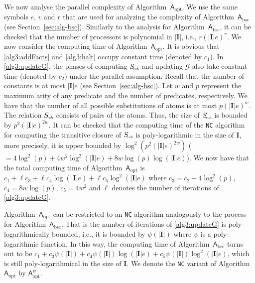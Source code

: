 We now analyse the parallel complexity of Algorithm~$\mathsf{A}_{\text{opt}}$.
We use the same symbols $e$, $v$ and $r$ that are used for analyzing the complexity of Algorithm~$\mathsf{A}_{\text{bsc}}$
(see Section~\ref{sec:alg-bsc}). Similarly to the analysis for Algorithm~$\mathsf{A}_{\text{bsc}}$, it can be checked that
the number of processors is polynomial in $|\textbf{I}|$, i.e., $r(|\textbf{I}|e)^v$.
We now consider the computing time of Algorithm~$\mathsf{A}_{\text{opt}}$. It
is obvious that \ref{alg3:addFacts} and
\ref{alg3:halt} occupy constant time (denoted by $c_1$). In \ref{alg3:updateG}, the phases of
computing $S_{\!\textit{\tiny rch}}$ and updating $\mathcal{G}$ also take constant time (denoted by $c_2$)
under the parallel assumption. Recall that the number of constants is at most $|\textbf{I}|e$ (see Section~\ref{sec:alg-bsc}).
Let $w$ and $p$ represent the maximum arity of any predicate and the number of predicates, respectively.
We have that the number of all possible substitutions of atoms is at most $p(|\textbf{I}|e)^w$.
The relation $S_{\!\textit{\tiny rch}}$ consists of pairs of the atoms. Thus, the size of $S_{\!\textit{\tiny rch}}$
is bounded by $p^2(|\textbf{I}|e)^{2w}$. It can be checked that the computing time of the \texttt{NC} algorithm for computing the transitive
closure of $S_{\!\textit{\tiny rch}}$ is poly-logarithmic in the size of $\textbf{I}$, more precisely,
it is upper bounded by $\log^2(p^2(|\textbf{I}|e)^{2w})$ ($=4\log^2(p)+4w^2\log^2(|\textbf{I}|e)+8w\log(p)\log(|\textbf{I}|e)$).
We now have that the total computing time of
Algorithm~$\mathsf{A}_{\text{opt}}$ is $c_1+\ell c_3 + \ell
c_4\log(|\textbf{I}|e) +\ell c_5\log^2(|\textbf{I}|e)$
where $c_3=c_2+4\log^2(p)$, $c_4=8w\log(p)$, $c_5=4w^2$ and $\ell$ denotes the number of iterations of \ref{alg3:updateG}.

Algorithm~$\mathsf{A}_{\text{opt}}$ can be restricted to an \texttt{NC} algorithm analogously to the process
for Algorithm~$\mathsf{A}_{\text{bsc}}$. That is the number of iterations of \ref{alg3:updateG}
is poly-logarithmically bounded, i.e., it is bounded by $\psi(|\textbf{I}|)$
where $\psi$ is a poly-logarithmic function. In this way, the computing time of
Algorithm~$\mathsf{A}_{\text{bsc}}$ turns out to be $c_1+c_3\psi(|\textbf{I}|)+c_4\psi(|\textbf{I}|)\log(|\textbf{I}|e)+
c_5\psi(|\textbf{I}|)\log^2(|\textbf{I}|e)$,
which is still poly-logarithmical in the size of $\textbf{I}$. We denote the
\texttt{NC} variant of Algorithm~$\mathsf{A}_{\text{opt}}$ by $\mathsf{A}_{\text{opt}}^{\psi}$.

